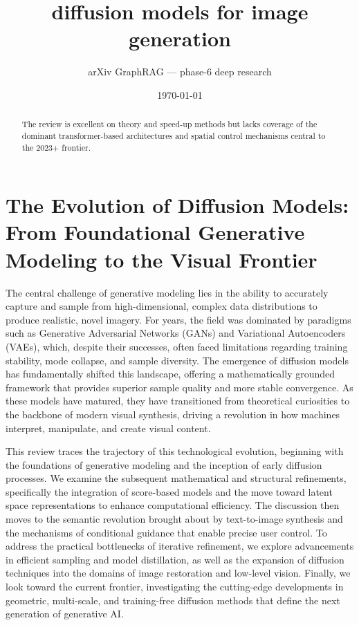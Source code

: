 \documentclass[11pt]{article}
\title{diffusion models for image generation}
\author{arXiv GraphRAG --- phase-6 deep research}
\date{\today}
\begin{document}
\maketitle

\begin{abstract}
The review is excellent on theory and speed-up methods but lacks coverage of the dominant transformer-based architectures and spatial control mechanisms central to the 2023+ frontier.
\end{abstract}

\section{The Evolution of Diffusion Models: From Foundational Generative Modeling to the Visual Frontier}

The central challenge of generative modeling lies in the ability to accurately capture and sample from high-dimensional, complex data distributions to produce realistic, novel imagery. For years, the field was dominated by paradigms such as Generative Adversarial Networks (GANs) and Variational Autoencoders (VAEs), which, despite their successes, often faced limitations regarding training stability, mode collapse, and sample diversity. The emergence of diffusion models has fundamentally shifted this landscape, offering a mathematically grounded framework that provides superior sample quality and more stable convergence. As these models have matured, they have transitioned from theoretical curiosities to the backbone of modern visual synthesis, driving a revolution in how machines interpret, manipulate, and create visual content.

This review traces the trajectory of this technological evolution, beginning with the foundations of generative modeling and the inception of early diffusion processes. We examine the subsequent mathematical and structural refinements, specifically the integration of score-based models and the move toward latent space representations to enhance computational efficiency. The discussion then moves to the semantic revolution brought about by text-to-image synthesis and the mechanisms of conditional guidance that enable precise user control. To address the practical bottlenecks of iterative refinement, we explore advancements in efficient sampling and model distillation, as well as the expansion of diffusion techniques into the domains of image restoration and low-level vision. Finally, we look toward the current frontier, investigating the cutting-edge developments in geometric, multi-scale, and training-free diffusion methods that define the next generation of generative AI.
\end{document}
